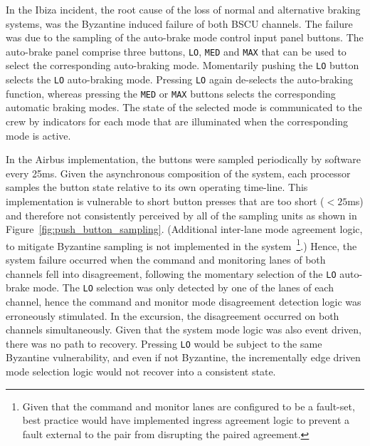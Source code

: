 In the Ibiza incident, the root cause of the loss of normal and alternative
braking systems, was the Byzantine induced failure of both BSCU channels. The
failure was due to the sampling of the auto-brake mode control input panel
buttons. The auto-brake panel comprise three buttons, \texttt{LO}, \texttt{MED} and \texttt{MAX} that can
be used to select the corresponding auto-braking mode.  Momentarily pushing the
\texttt{LO} button selects the \texttt{LO} auto-braking mode. Pressing \texttt{LO} again de-selects the
auto-braking function, whereas pressing the \texttt{MED} or \texttt{MAX} buttons  selects the
corresponding automatic braking  modes. The state of the selected mode is
communicated to the crew by indicators for each mode that are illuminated when
the corresponding mode is active.

In the Airbus implementation, the buttons were sampled periodically by software
every 25ms. Given the asynchronous composition of the system, each processor
samples the button state relative to its own operating time-line. This
implementation is vulnerable to short button presses that are too short ($< 25$ms)
and therefore not consistently perceived by all of the sampling units as shown in Figure~\ref{fig:push_button_sampling}.
(Additional inter-lane mode agreement logic, to mitigate Byzantine sampling is
not implemented in the system~\footnote{Given that the command and monitor lanes
  are configured to be a fault-set, best practice would have implemented ingress
  agreement logic to prevent a fault external to the pair from disrupting the
  paired agreement.}.) Hence, the system failure occurred when the command and
monitoring lanes of both channels fell into disagreement, following the momentary 
selection of the \texttt{LO} auto-brake mode. The \texttt{LO} selection was only detected by one
of the lanes of each channel, hence the command and monitor mode disagreement
detection logic was erroneously stimulated. In the excursion, the disagreement
occurred on both channels simultaneously. Given that the system mode logic was
also event driven, there was no path to recovery. Pressing \texttt{LO} would be subject
to the same Byzantine vulnerability, and even if not Byzantine, the
incrementally edge driven mode selection logic would not recover into a
consistent state.

